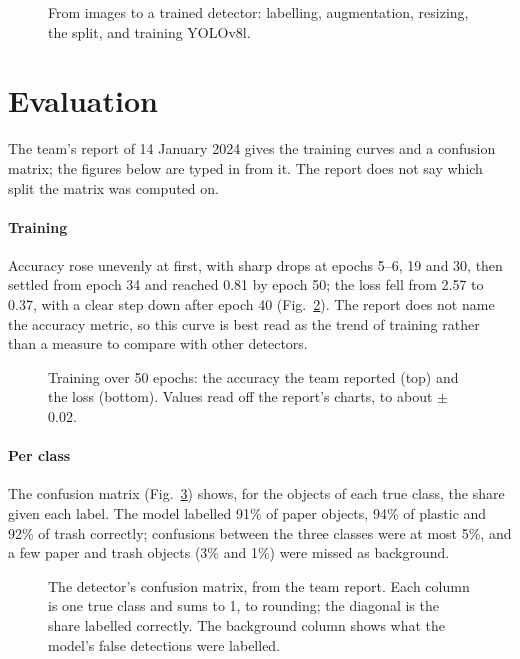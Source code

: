 \documentclass[11pt]{article}
\begin{document}
\begin{figure}[htbp]
  \centering
  \caption{From images to a trained detector: labelling, augmentation, resizing, the split, and training YOLOv8l.}
  \label{fig:dataset}
\end{figure}

\section{Evaluation}
\label{sec:eval}

The team's report of 14 January 2024 gives the training curves and a confusion matrix; the figures below are typed in from it. The report does not say which split the matrix was computed on.

\paragraph{Training} Accuracy rose unevenly at first, with sharp drops at epochs 5--6, 19 and 30, then settled from epoch 34 and reached 0.81 by epoch 50; the loss fell from 2.57 to 0.37, with a clear step down after epoch 40 (Fig.~\ref{fig:training}). The report does not name the accuracy metric, so this curve is best read as the trend of training rather than a measure to compare with other detectors.

\begin{figure}[htbp]
  \centering
  \par\medskip
  \caption{Training over 50 epochs: the accuracy the team reported (top) and the loss (bottom). Values read off the report's charts, to about $\pm$0.02.}
  \label{fig:training}
\end{figure}

\paragraph{Per class} The confusion matrix (Fig.~\ref{fig:cm}) shows, for the objects of each true class, the share given each label. The model labelled 91\% of paper objects, 94\% of plastic and 92\% of trash correctly; confusions between the three classes were at most 5\%, and a few paper and trash objects (3\% and 1\%) were missed as background.

\begin{figure}[htbp]
  \centering
  \caption{The detector's confusion matrix, from the team report. Each column is one true class and sums to 1, to rounding; the diagonal is the share labelled correctly. The background column shows what the model's false detections were labelled.}
  \label{fig:cm}
\end{figure}
\end{document}
